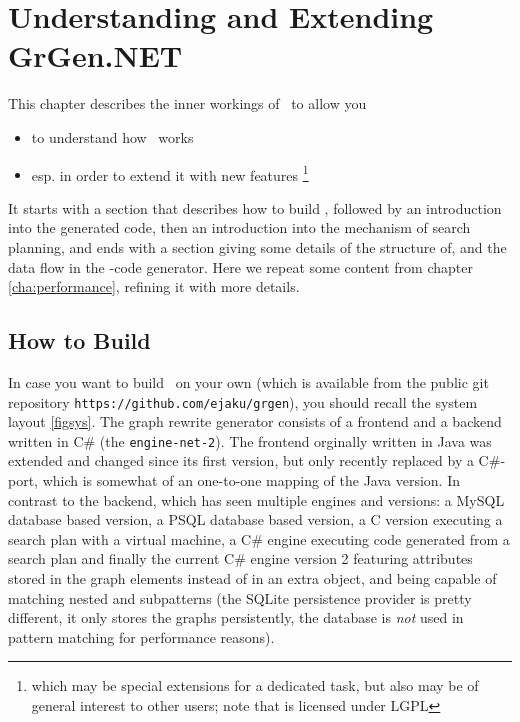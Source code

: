 \chapter{Understanding and Extending GrGen.NET} \label{cha:developing}

This chapter describes the inner workings of \GrG~to allow you
\begin{itemize}
\item to understand how \GrG~works
\item esp. in order to extend it with new features
\footnote{which may be special extensions for a dedicated task, but also may be of general interest to other users; note that \GrG{} is licensed under LGPL}
\end{itemize}
It starts with a section that describes how to build \GrG, followed by an introduction into the generated code, then an introduction into the mechanism of search planning, and ends with a section giving some details of the structure of, and the data flow in the \GrG-code generator.
Here we repeat some content from chapter \ref{cha:performance}, refining it with more details.


\section{How to Build}\label{sub:building}

In case you want to build \GrG~on your own (which is available from the public git repository \texttt{https://github.com/ejaku/grgen}), you should recall the system layout \ref{figsys}. 
The graph rewrite generator consists of a frontend and a backend written in C\# \cite{csharp} (the \texttt{engine-net-2}).
The frontend orginally written in Java \cite{Java} was extended and changed since its first version, but only recently replaced by a C\#-port, which is somewhat of an one-to-one mapping of the Java version.
In contrast to the backend, which has seen multiple engines and versions: a MySQL database based version, a PSQL database based version, 
a C version executing a search plan with a virtual machine, a C\# engine executing code generated from a search plan and finally the current C\# engine version 2 featuring attributes stored in the graph elements instead of in an extra object, and being capable of matching nested and subpatterns (the SQLite persistence provider is pretty different, it only stores the graphs persistently, the database is \emph{not} used in pattern matching for performance reasons).

